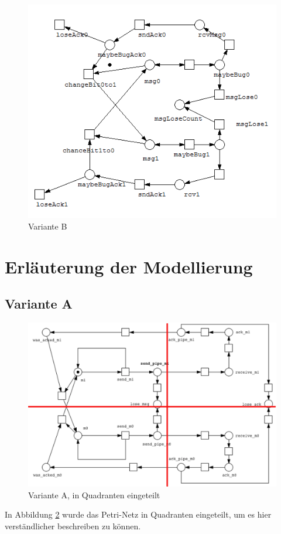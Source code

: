 \documentclass[]{scrartcl}
\begin{document}
\begin{figure}[htbp]
	\centering
	\includegraphics[width=1\linewidth]{altBitPro.png}
	\caption{Variante B}
	\label{fig:petri_net_B}
\end{figure}

\section{Erläuterung der Modellierung}
\subsection{Variante A}
\begin{figure}[htbp]
	\centering
	\includegraphics[width=1\linewidth]{petrinet_grid.png}
	\caption{Variante A, in Quadranten eingeteilt}
	\label{fig:petri_net_A_withgrid}
\end{figure}
In Abbildung \ref{fig:petri_net_A_withgrid} wurde das Petri-Netz in Quadranten eingeteilt, um es hier verständlicher beschreiben zu können.
\end{document}
